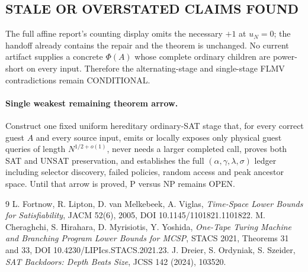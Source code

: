 \documentclass[11pt]{article}
\begin{document}
\subsection*{STALE OR OVERSTATED CLAIMS FOUND}
The full affine report's counting display omits the necessary $+1$ at $u_N=0$;
the handoff already contains the repair and the theorem is unchanged.  No current
artifact supplies a concrete $\Phi(A)$ whose complete ordinary children are
power-short on every input.  Therefore the alternating-stage and single-stage
FLMV contradictions remain CONDITIONAL.

\paragraph{Single weakest remaining theorem arrow.}
Construct one fixed uniform hereditary ordinary-SAT stage that, for every correct
guest $A$ and every source input, emits or locally exposes only physical guest
queries of length $N^{1/2+o(1)}$, never needs a larger completed call, proves both
SAT and UNSAT preservation, and establishes the full
$(\alpha,\gamma,\lambda,\sigma)$ ledger including selector discovery, failed
policies, random access and peak ancestor space.  Until that arrow is proved,
P versus NP remains OPEN.

\begin{thebibliography}{9}
 L. Fortnow, R. Lipton, D. van Melkebeek, A. Viglas,
\emph{Time-Space Lower Bounds for Satisfiability}, JACM 52(6), 2005,
DOI 10.1145/1101821.1101822.
 M. Cheraghchi, S. Hirahara, D. Myrisiotis, Y. Yoshida,
\emph{One-Tape Turing Machine and Branching Program Lower Bounds for MCSP},
STACS 2021, Theorems 31 and 33, DOI 10.4230/LIPIcs.STACS.2021.23.
 J. Dreier, S. Ordyniak, S. Szeider,
\emph{SAT Backdoors: Depth Beats Size}, JCSS 142 (2024), 103520.
\end{thebibliography}
\end{document}
